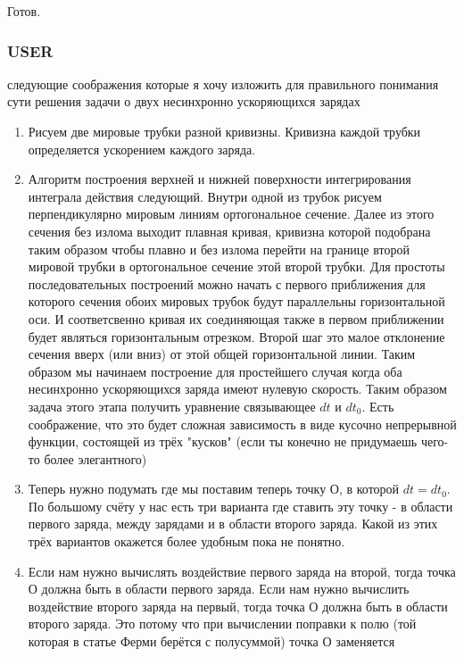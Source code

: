 \documentclass[11pt]{article}
\providecommand{\tightlist}{%
      \setlength{\itemsep}{0pt}\setlength{\parskip}{0pt}}
\begin{document}
Готов.

    \subsubsection{USER}

следующие соображения которые я хочу изложить для правильного понимания
сути решения задачи о двух несинхронно ускоряющихся зарядах

\begin{enumerate}
\def\labelenumi{\arabic{enumi}.}
\tightlist
\item
  Рисуем две мировые трубки разной кривизны. Кривизна каждой трубки
  определяется ускорением каждого заряда.
\item
  Алгоритм построения верхней и нижней поверхности интегрирования
  интеграла действия следующий. Внутри одной из трубок рисуем
  перпендикулярно мировым линиям ортогональное сечение. Далее из этого
  сечения без излома выходит плавная кривая, кривизна которой подобрана
  таким образом чтобы плавно и без излома перейти на границе второй
  мировой трубки в ортогональное сечение этой второй трубки. Для
  простоты последовательных построений можно начать с первого
  приближения для которого сечения обоих мировых трубок будут
  параллельны горизонтальной оси. И соответсвенно кривая их соединяющая
  также в первом приближении будет являться горизонтальным отрезком.
  Второй шаг это малое отклонение сечения вверх (или вниз) от этой общей
  горизонтальной линии. Таким образом мы начинаем построение для
  простейшего случая когда оба несинхронно ускоряющихся заряда имеют
  нулевую скорость. Таким образом задача этого этапа получить уравнение
  связывающее \(dt\) и \(dt_0\). Есть соображение, что это будет сложная
  зависимость в виде кусочно непрерывной функции, состоящей из трёх
  "кусков" (если ты конечно не придумаешь чего-то более элегантного)
\item
  Теперь нужно подумать где мы поставим теперь точку О, в которой
  \(dt=dt_0\). По большому счёту у нас есть три варианта где ставить эту
  точку - в области первого заряда, между зарядами и в области второго
  заряда. Какой из этих трёх вариантов окажется более удобным пока не
  понятно.
\item
  Если нам нужно вычислять воздействие первого заряда на второй, тогда
  точка О должна быть в области первого заряда. Если нам нужно вычислить
  воздействие второго заряда на первый, тогда точка О должна быть в
  области второго заряда. Это потому что при вычислении поправки к полю
  (той которая в статье Ферми берётся с полусуммой) точка О заменяется

\end{enumerate}
\end{document}
